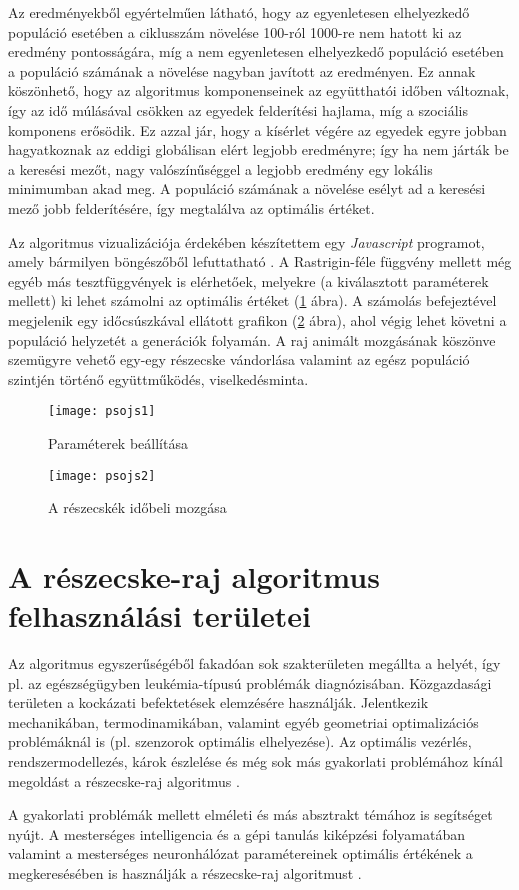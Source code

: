 Az eredményekből egyértelműen látható, hogy az egyenletesen elhelyezkedő populáció esetében a ciklusszám növelése 100-ról 1000-re nem hatott ki az eredmény pontosságára, míg a nem egyenletesen elhelyezkedő populáció esetében a populáció számának a növelése nagyban javított az eredményen. Ez annak köszönhető, hogy az algoritmus komponenseinek az együtthatói időben változnak, így az idő múlásával csökken az egyedek felderítési hajlama, míg a szociális komponens erősödik. Ez azzal jár, hogy a kísérlet végére az egyedek egyre jobban hagyatkoznak az eddigi globálisan elért legjobb eredményre; így ha nem járták be a keresési mezőt, nagy valószínűséggel a legjobb eredmény egy lokális minimumban akad meg. A populáció számának a növelése esélyt ad a keresési mező jobb felderítésére, így megtalálva az optimális értéket.

Az algoritmus vizualizációja érdekében készítettem egy \textit{Javascript} programot, amely bármilyen böngészőből lefuttatható \parencite{kissjs2020}. A Rastrigin-féle függvény mellett még egyéb más tesztfüggvények is elérhetőek, melyekre (a kiválasztott paraméterek mellett) ki lehet számolni az optimális értéket (\ref{fig:psojs1} ábra). A számolás befejeztével megjelenik egy időcsúszkával ellátott grafikon (\ref{fig:psojs2} ábra), ahol végig lehet követni a populáció helyzetét a generációk folyamán. A raj animált mozgásának köszönve szemügyre vehető egy-egy részecske vándorlása valamint az egész populáció szintjén történő együttműködés, viselkedésminta.

\begin{figure}
    \centering
    \texttt{[image: psojs1]}
    \caption{Paraméterek beállítása}
    \label{fig:psojs1}
\end{figure}

\begin{figure}
    \centering
    \texttt{[image: psojs2]}
    \caption{A részecskék időbeli mozgása}
    \label{fig:psojs2}
\end{figure}

\section{A részecske-raj algoritmus felhasználási területei}

Az algoritmus egyszerűségéből fakadóan sok szakterületen megállta a helyét, így pl. az egészségügyben leukémia-típusú problémák diagnózisában. Közgazdasági területen a kockázati befektetések elemzésére használják. Jelentkezik mechanikában, termodinamikában, valamint egyéb geometriai optimalizációs problémáknál is (pl. szenzorok optimális elhelyezése). Az optimális vezérlés, rendszermodellezés, károk észlelése és még sok más gyakorlati problémához kínál megoldást a részecske-raj algoritmus \parencite{almeida2019}.

A gyakorlati problémák mellett elméleti és más absztrakt témához is segítséget nyújt. A mesterséges intelligencia és a gépi tanulás kiképzési folyamatában valamint a mesterséges neuronhálózat paramétereinek optimális értékének a megkeresésében is használják a részecske-raj algoritmust \parencite{kanovic2017}.
